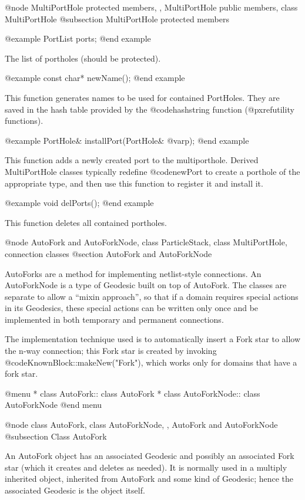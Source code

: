 @node MultiPortHole protected members,  , MultiPortHole public members, class MultiPortHole
@subsection MultiPortHole protected members

@example
PortList ports;
@end example

The list of portholes (should be protected).

@example
const char* newName();
@end example

This function generates names to be used for contained PortHoles.  They
are saved in the hash table provided by the @code{hashstring} function
(@pxref{utility functions}).

@example
PortHole& installPort(PortHole& @var{p});
@end example

This function adds a newly created port to the multiporthole.  Derived
MultiPortHole classes typically redefine @code{newPort} to create a
porthole of the appropriate type, and then use this function to register
it and install it.

@example
void delPorts();
@end example

This function deletes all contained portholes.

@node AutoFork and AutoForkNode, class ParticleStack, class MultiPortHole, connection classes
@section AutoFork and AutoForkNode

AutoForks are a method for implementing netlist-style connections.
An AutoForkNode is a type of Geodesic built on top of AutoFork.
The classes are separate to allow a ``mixin approach'', so that if
a domain requires special actions in its Geodesics, these special
actions can be written only once and be implemented in both
temporary and permanent connections.

The implementation technique used is to automatically insert a Fork
star to allow the n-way connection; this Fork star is created by
invoking @code{KnownBlock::makeNew("Fork")}, which works only for
domains that have a fork star.

@menu
* class AutoFork::  class AutoFork
* class AutoForkNode::  class AutoForkNode
@end menu

@node class AutoFork, class AutoForkNode,  , AutoFork and AutoForkNode
@subsection Class AutoFork

An AutoFork object has an associated Geodesic and possibly an associated
Fork star (which it creates and deletes as needed).  It is normally used
in a multiply inherited object, inherited from AutoFork and some kind
of Geodesic; hence the associated Geodesic is the object itself.

